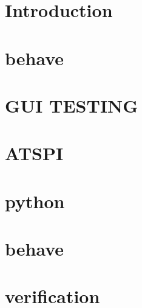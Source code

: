 
\chapter{Introduction}

\chapter{behave}
\chapter{GUI TESTING}
\chapter{ATSPI}
\chapter{python}
\chapter{behave}
\chapter{verification}